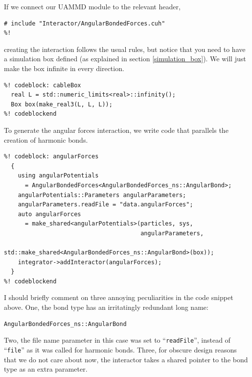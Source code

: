 If we connect our UAMMD module to the relevant header,
\begin{lstlisting}
# include "Interactor/AngularBondedForces.cuh"
%!
\end{lstlisting}
creating the interaction follows the usual rules, but notice that you need to
have a simulation box defined (as explained in section \ref{simulation_box}). We
will just make the box infinite in every direction.
\begin{lstlisting}
%! codeblock: cableBox
  real L = std::numeric_limits<real>::infinity();
  Box box(make_real3(L, L, L));
%! codeblockend
\end{lstlisting}
To generate the angular forces interaction, we write code that parallels the
creation of harmonic bonds.
\begin{lstlisting}
%! codeblock: angularForces
  {
    using angularPotentials
      = AngularBondedForces<AngularBondedForces_ns::AngularBond>;
    angularPotentials::Parameters angularParameters;
    angularParameters.readFile = "data.angularForces";
    auto angularForces
      = make_shared<angularPotentials>(particles, sys,
                                       angularParameters,
                                       std::make_shared<AngularBondedForces_ns::AngularBond>(box));
    integrator->addInteractor(angularForces);
  }
%! codeblockend
\end{lstlisting}
I should briefly comment on three annoying peculiarities in the code snippet
above. One, the bond type has an irritatingly redundant long name:
\begin{verbatim}
AngularBondedForces_ns::AngularBond
\end{verbatim}
Two, the file name parameter in this case was set to ``\texttt{readFile}'', 
instead of ``\texttt{file}'' as it was called for harmonic bonds. Three, for 
obscure design reasons that we do not care about now, the interactor takes a 
shared pointer to the bond type as an extra parameter.

